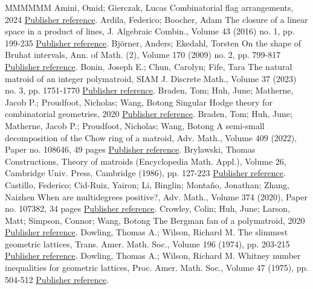 \begin{thebibliography}{MMMMMM}
 Amini, Omid; Gierczak, Lucas Combinatorial flag arrangements, 2024 \href{https://alco.centre-mersenne.org/articles/10.5802/alco.447/#AG24}{Publisher reference}.
 Ardila, Federico; Boocher, Adam The closure of a linear space in a product of lines, J. Algebraic Combin., Volume 43 (2016) no. 1, pp. 199-235 \href{https://alco.centre-mersenne.org/articles/10.5802/alco.447/#AB16}{Publisher reference}.
 Björner, Anders; Ekedahl, Torsten On the shape of Bruhat intervals, Ann. of Math. (2), Volume 170 (2009) no. 2, pp. 799-817 \href{https://alco.centre-mersenne.org/articles/10.5802/alco.447/#BE09}{Publisher reference}.
 Bonin, Joseph E.; Chun, Carolyn; Fife, Tara The natural matroid of an integer polymatroid, SIAM J. Discrete Math., Volume 37 (2023) no. 3, pp. 1751-1770 \href{https://alco.centre-mersenne.org/articles/10.5802/alco.447/#BCF22}{Publisher reference}.
 Braden, Tom; Huh, June; Matherne, Jacob P.; Proudfoot, Nicholas; Wang, Botong Singular Hodge theory for combinatorial geometries, 2020 \href{https://alco.centre-mersenne.org/articles/10.5802/alco.447/#BHMPW20b}{Publisher reference}.
 Braden, Tom; Huh, June; Matherne, Jacob P.; Proudfoot, Nicholas; Wang, Botong A semi-small decomposition of the Chow ring of a matroid, Adv. Math., Volume 409 (2022), Paper no. 108646, 49 pages \href{https://alco.centre-mersenne.org/articles/10.5802/alco.447/#BHMPW20}{Publisher reference}.
 Brylawski, Thomas Constructions, Theory of matroids (Encyclopedia Math. Appl.), Volume 26, Cambridge Univ. Press, Cambridge (1986), pp. 127-223 \href{https://alco.centre-mersenne.org/articles/10.5802/alco.447/#B86}{Publisher reference}.
 Castillo, Federico; Cid-Ruiz, Yairon; Li, Binglin; Montaño, Jonathan; Zhang, Naizhen When are multidegrees positive?, Adv. Math., Volume 374 (2020), Paper no. 107382, 34 pages \href{https://alco.centre-mersenne.org/articles/10.5802/alco.447/#CFCYL20}{Publisher reference}.
 Crowley, Colin; Huh, June; Larson, Matt; Simpson, Connor; Wang, Botong The Bergman fan of a polymatroid, 2020 \href{https://alco.centre-mersenne.org/articles/10.5802/alco.447/#CHLSW22}{Publisher reference}.
 Dowling, Thomas A.; Wilson, Richard M. The slimmest geometric lattices, Trans. Amer. Math. Soc., Volume 196 (1974), pp. 203-215 \href{https://alco.centre-mersenne.org/articles/10.5802/alco.447/#DW74}{Publisher reference}.
 Dowling, Thomas A.; Wilson, Richard M. Whitney number inequalities for geometric lattices, Proc. Amer. Math. Soc., Volume 47 (1975), pp. 504-512 \href{https://alco.centre-mersenne.org/articles/10.5802/alco.447/#DW75}{Publisher reference}.

\end{thebibliography}
